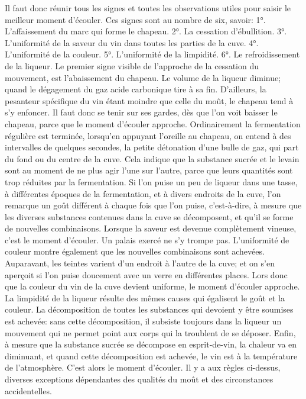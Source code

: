 Il faut donc réunir tous les signes et toutes les observations utiles pour saisir le meilleur moment d'écouler. Ces signes sont au nombre de six, savoir:
1°. L'affaissement du marc qui forme le chapeau.\setcounter{page}{145} 2°. La cessation d'ébullition.
3°. L'uniformité de la saveur du vin dans toutes les parties de la cuve.
4°. L'uniformité de la couleur.
5°. L'uniformité de la limpidité.
6°. Le refroidissement de la liqueur.
Le premier signe visible de l'approche de la cessation du mouvement, est l'abaissement du chapeau. Le volume de la liqueur diminue; quand le dégagement du gaz acide carbonique tire à sa fin. D'ailleurs, la pesanteur spécifique du vin étant moindre que celle du moût, le chapeau tend à s'y enfoncer. Il faut donc se tenir sur ses gardes, dès que l'on voit baisser le chapeau, parce que le moment d'écouler approche.
Ordinairement la fermentation régulière est terminée, lorsqu'en appuyant l'oreille au chapeau, on entend à des intervalles de quelques secondes, la petite détonation d'une bulle de gaz, qui part du fond ou du centre de la cuve. Cela indique que la substance sucrée et le levain sont au moment de ne plus agir l'une sur l'autre, parce que leurs quantités sont trop réduites par la fermentation.
Si l'on puise un peu de liqueur dans une tasse, à différentes époques de la fermentation, et à divers endroits de la cuve, l'on\setcounter{page}{146} remarque un goût différent à chaque fois que l'on puise, c'est-à-dire, à mesure que les diverses substances contenues dans la cuve se décomposent, et qu'il se forme de nouvelles combinaisons. Lorsque la saveur est devenue complètement vineuse, c'est le moment d'écouler. Un palais exercé ne s'y trompe pas.
L'uniformité de couleur montre également que les nouvelles combinaisons sont achevées. Auparavant, les teintes varient d'un endroit à l'autre de la cuve; et on s'en aperçoit si l'on puise doucement avec un verre en différentes places. Lors donc que la couleur du vin de la cuve devient uniforme, le moment d'écouler approche.
La limpidité de la liqueur résulte des mêmes causes qui égalisent le goût et la couleur. La décomposition de toutes les substances qui devoient y être soumises est achevée: sans cette décomposition, il subsiste toujours dans la liqueur un mouvement qui ne permet point aux corps qui la troublent de se déposer.
Enfin, à mesure que la substance sucrée se décompose en esprit-de-vin, la chaleur va en diminuant, et quand cette décomposition est achevée, le vin est à la température de l'atmosphère. C'est alors le moment d'écouler.\setcounter{page}{147} Il y a aux règles ci-dessus, diverses exceptions dépendantes des qualités du moût et des circonstances accidentelles.
